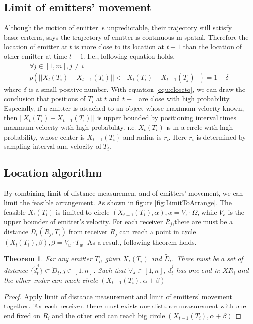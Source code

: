 \documentclass[conference]{IEEEtran}
\newtheorem{theorem}{Theorem}
\begin{document}
\subsection{Limit of emitters' movement }
Although the motion of emitter is unpredictable, their trajectory still satisfy 
basic criteria, says the trajectory of emitter is continuous in spatial.
Therefore the location of emitter at $t$ is more close to its location at $t-1$ than the
location of other emitter at time $t-1$. I.e., following equation holds,
\begin{equation}
    \begin{split}
	&\forall j\in[1,m],j\ne i\\
	&p(||X_t(T_i)-X_{t-1}(T_i)||<||X_t(T_i)-X_{t-1}(T_j)||)=1-\delta
    \end{split}
    \label{equ:closeto}
\end{equation}
where $\delta$ is a small positive number. With equation \ref{equ:closeto}, we can draw
the conclusion that positions of $T_i$ at $t$ and $t-1$ are close with high probability.
Especially, if a emitter is attached to an object whose maximum velocity known, then
$||X_t(T_i)-X_{t-1}(T_i)||$ is upper bounded by positioning interval times maximum
velocity with high probability. i.e. $X_t(T_i)$ is in a circle with high probability,
whose center is $X_{t-1}(T_i)$ and radius is $r_i$. Here $r_i$ is determined by sampling
interval and velocity of $T_i$. 

\subsection{Location algorithm}
By combining limit of distance measurement and of emitters' movement, we can limit the
feasible arrangement. As shown in figure \ref{fig:LimitToArrange}. The feasible
$X_t(T_i)$ is limited to circle $(X_{t-1}(T_i), \alpha), \alpha=V_e\cdot\Omega$, while
$V_e$ is the upper bounder of emitter's velocity. For each receiver $R_j$,there are must
be a distance $D_t(R_j,T_i)$ from receiver $R_j$ can reach a point in cycle
$(X_t(T_i),\beta),\beta=V_u\cdot T_w$. As a result, following theorem holds.
\begin{theorem}
    For any emitter $T_i$, given $X_t(T_i)$ and $\tilde{D}_t$. There must be a set of distance 
    $\{\tilde{d}_t^j\}\subset \tilde{D}_t,j\in[1,n]$. Such that $\forall
    j\in[1,n]$, $\tilde{d}_t^j$ has one end in $X{R_i}$ and the other ender can
    reach circle $(X_{t-1}(T_i),\alpha+\beta)$ 
    \label{Thm:limit}
\end{theorem}
\begin{proof}
Apply limit of distance measurement and limit of emitters' movement together.
For each receiver, there must exists one distance measurement with one end
fixed on $R_i$ and the other end can reach big circle $(X_{t-1}(T_i),\alpha+\beta)$
\end{proof}
\end{document}
